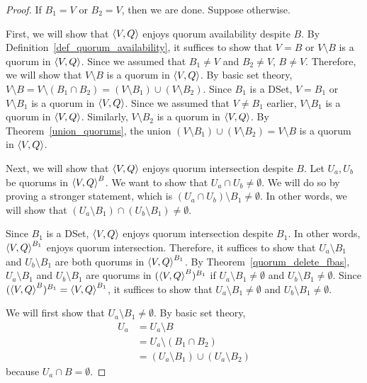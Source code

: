 \documentclass[12pt, psamsfonts]{amsart}
\theoremstyle{definition}
\theoremstyle{remark}
\numberwithin{equation}{subsection}
\begin{document}
\begin{proof}
	If $B_1 = V$ or $B_2 = V$, then we are done.
	Suppose otherwise.

    First, we will show that $\ev{V, Q}$ enjoys quorum availability despite $B$.
    By Definition~\ref{def_quorum_availability}, it suffices to show that $V = B$ or $V \setminus B$ is a quorum in $\ev{V, Q}$.
    Since we assumed that $B_1 \ne V$ and $B_2 \ne V$, $B \ne V$.
    Therefore, we will show that $V \setminus B$ is a quorum in $\ev{V, Q}$.
    By basic set theory, $V \setminus B = V \setminus (B_1 \cap B_2) = (V \setminus B_1) \cup (V \setminus B_2)$.
    Since $B_1$ is a DSet, $V = B_1$ or $V \setminus B_1$ is a quorum in $\ev{V, Q}$.
    Since we assumed that $V \ne B_1$ earlier, $V \setminus B_1$ is a quorum in $\ev{V, Q}$.
    Similarly, $V \setminus B_2$ is a quorum in $\ev{V, Q}$.
    By Theorem~\ref{union_quorums}, the union $(V \setminus B_1) \cup (V \setminus B_2) = V \setminus B$ is a quorum in $\ev{V, Q}$.

    Next, we will show that $\ev{V, Q}$ enjoys quorum intersection despite $B$.
	Let $U_a, U_b$ be quorums in $\ev{V, Q}^B$.
    We want to show that $U_a \cap U_b \ne \emptyset$.
    We will do so by proving a stronger statement, which is $(U_a \cap U_b) \setminus B_1 \ne \emptyset$.
    In other words, we will show that $(U_a \setminus B_1) \cap (U_b \setminus B_1) \ne \emptyset$.

    Since $B_1$ is a DSet, $\ev{V, Q}$ enjoys quorum intersection despite $B_1$.
    In other words, $\ev{V, Q}^{B_1}$ enjoys quorum intersection.
    Therefore, it suffices to show that $U_a \setminus B_1$ and $U_b \setminus B_1$ are both quorums in $\ev{V, Q}^{B_1}$.
    By Theorem~\ref{quorum_delete_fbas}, $U_a \setminus B_1$ and $U_b \setminus B_1$ are quorums in $(\ev{V, Q}^B)^{B_1}$ if $U_a \setminus B_1 \ne \emptyset$ and $U_b \setminus B_1 \ne \emptyset$.
    Since $(\ev{V, Q}^B)^{B_1} = \ev{V, Q}^{B_1}$, it suffices to show that $U_a \setminus B_1 \ne \emptyset$ and $U_b \setminus B_1 \ne \emptyset$.
    
    We will first show that $U_a \setminus B_1 \ne \emptyset$.
    By basic set theory,
	\begin{align*}
        U_a &= U_a \setminus B \\
            &= U_a \setminus (B_1 \cap B_2) \\
            &= (U_a \setminus B_1) \cup (U_a \setminus B_2)
	\end{align*}
	because $U_a \cap B = \emptyset$.


\end{proof}
\end{document}
